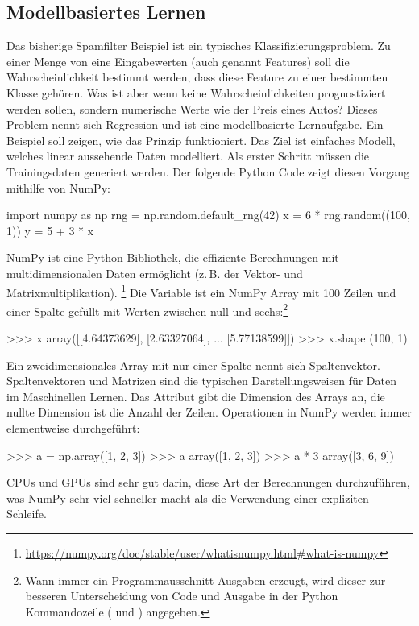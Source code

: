 \subsection{Modellbasiertes Lernen}
Das bisherige Spamfilter Beispiel ist ein typisches
Klassifizierungsproblem. Zu einer Menge von eine Eingabewerten
(auch genannt Features) soll die Wahrscheinlichkeit bestimmt werden,
dass diese Feature zu einer bestimmten Klasse gehören.
Was ist aber wenn keine Wahrscheinlichkeiten
prognostiziert werden sollen, sondern numerische Werte wie
der Preis eines Autos? Dieses Problem nennt sich Regression und
ist eine modellbasierte Lernaufgabe.
Ein Beispiel soll zeigen, wie das Prinzip funktioniert.
Das Ziel ist einfaches Modell, welches linear aussehende Daten modelliert.
Als erster Schritt müssen die Trainingsdaten generiert werden.
Der folgende Python Code zeigt diesen Vorgang mithilfe von NumPy:
\begin{pythoncode}
import numpy as np
rng = np.random.default_rng(42)
x = 6 * rng.random((100, 1))
y = 5 + 3 * x
\end{pythoncode}
NumPy ist eine Python Bibliothek, die effiziente Berechnungen mit
multidimensionalen Daten ermöglicht (z.\,B. der Vektor- und Matrixmultiplikation).
\footnote{\url{https://numpy.org/doc/stable/user/whatisnumpy.html\#what-is-numpy}}
Die Variable  ist ein NumPy Array mit 100 Zeilen und einer Spalte
gefüllt mit Werten zwischen null und sechs:\footnote{
  Wann immer ein Programmausschnitt Ausgaben erzeugt, wird
  dieser zur besseren Unterscheidung von Code und Ausgabe in der Python Kommandozeile
  (\pythoninline{>>>} und ) angegeben.
}
\begin{pyconcode}
>>> x
array([[4.64373629],
       [2.63327064],
       ...
       [5.77138599]])
>>> x.shape
(100, 1)
\end{pyconcode}
Ein zweidimensionales Array mit nur einer Spalte nennt sich Spaltenvektor.
Spaltenvektoren und Matrizen sind die typischen Darstellungsweisen
für Daten im Maschinellen Lernen.
Das Attribut  gibt die Dimension des Arrays an, die nullte
Dimension ist die Anzahl der Zeilen.
Operationen in NumPy werden immer elementweise durchgeführt:
\begin{pyconcode}
>>> a = np.array([1, 2, 3])
>>> a
array([1, 2, 3])
>>> a * 3
array([3, 6, 9])
\end{pyconcode}
CPUs und GPUs sind sehr gut darin, diese Art der Berechnungen durchzuführen,
was NumPy sehr viel schneller macht als die Verwendung einer expliziten Schleife.
